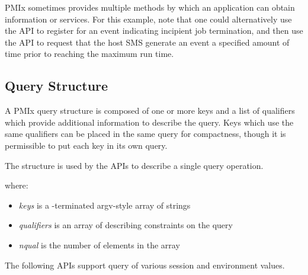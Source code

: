 \ac{PMIx} sometimes provides multiple methods by which an application can obtain information or services.  For this example,
note that one could alternatively use the  \ac{API} to register for an event indicating incipient job termination, and then use the  \ac{API} to request that the host \ac{SMS} generate an event a specified amount of time prior to reaching the maximum run time.

\subsection{Query Structure}

A \ac{PMIx} query structure is composed of one or more keys and a list of qualifiers which provide additional information to describe the query.
Keys which use the same qualifiers can be placed in the same query for compactness, though it is permissible to put each key in its own query.

The  structure is used by the  \acp{API} to describe a single query operation.


where:

\begin{itemize}
    \item \emph{keys} is a -terminated argv-style array of strings
    \item \emph{qualifiers} is an array of  describing constraints on the query
    \item \emph{nqual} is the number of elements in the  array
\end{itemize}

The following \acp{API} support query of various session and environment values.

\subsection{}


